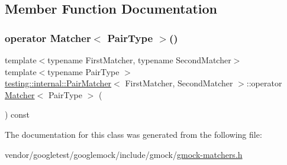 \subsection{Member Function Documentation}
\mbox{\label{classtesting_1_1internal_1_1_pair_matcher_ae9461cc22148c6b15ad94eb5ad7c8a50}} 
\subsubsection{\texorpdfstring{operator Matcher$<$ Pair\+Type $>$()}{operator Matcher< PairType >()}}
{\footnotesize\ttfamily template$<$typename First\+Matcher, typename Second\+Matcher$>$ \\
template$<$typename Pair\+Type $>$ \\
\hyperlink{classtesting_1_1internal_1_1_pair_matcher}{testing\+::internal\+::\+Pair\+Matcher}$<$ First\+Matcher, Second\+Matcher $>$\+::operator \hyperlink{classtesting_1_1_matcher}{Matcher}$<$ Pair\+Type $>$ (\begin{DoxyParamCaption}{ }\end{DoxyParamCaption}) const\hspace{0.3cm}{\ttfamily [inline]}}



The documentation for this class was generated from the following file\+:\begin{DoxyCompactItemize}
\item 
vendor/googletest/googlemock/include/gmock/\hyperlink{gmock-matchers_8h}{gmock-\/matchers.\+h}\end{DoxyCompactItemize}
